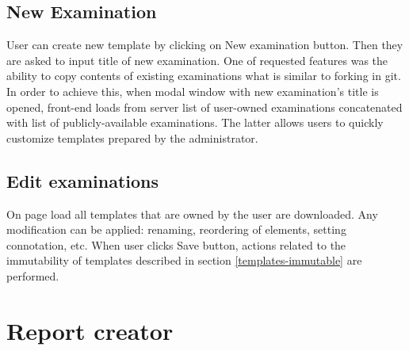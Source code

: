 \documentclass[12pt, twoside, openany]{report}
\theoremstyle{definition}
\begin{document}
\subsection{New Examination}
User can create new template by clicking on New examination button. Then they are asked to input title of new examination. One of requested features was the ability to copy contents of existing examinations what is similar to forking in git. In order to achieve this, when modal window with new examination's title is opened, front-end loads from server list of user-owned examinations concatenated with list of publicly-available examinations. The latter allows users to quickly customize templates prepared by the administrator.

\subsection{Edit examinations}
On page load all templates that are owned by the user are downloaded. Any modification can be applied: renaming, reordering of elements, setting connotation, etc. When user clicks Save button, actions related to the immutability of templates described in section \ref{templates-immutable} are performed.


\section{Report creator}
\end{document}
